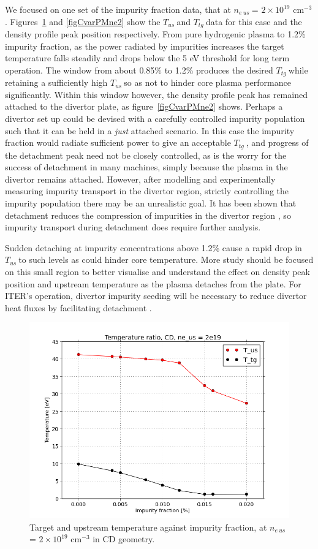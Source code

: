 \documentclass[12pt]{article}  %
\providecommand{\noNe}[1]{{${#1}\times 10^{19}$ cm$^{-3}$}} %
\providecommand{\neus}{$n_{e~us}~$} %
\providecommand{\Tus}{$T_{us}~$} %
\providecommand{\Ttg}{$T_{tg}~$} %
\begin{document}
We focused on one set of the impurity fraction data, that at \neus = \noNe{2}.  Figures~\ref{figCvarTRne2} and \ref{figCvarPMne2} show the \Tus and \Ttg data for this case and the density profile peak position respectively. From pure hydrogenic plasma to 1.2\% impurity fraction, as the power radiated by impurities increases the target temperature falls steadily and drops below the 5 eV threshold for long term operation. The window from about 0.85\% to 1.2\% produces the desired \Ttg while retaining a sufficiently high \Tus so as not to hinder core plasma performance significantly. Within this window however, the density profile peak has remained attached to the divertor plate, as figure~\ref{figCvarPMne2} shows. Perhaps a divertor set up could be devised with a carefully controlled impurity population such that it can be held in a \textit{just} attached scenario. In this case the impurity fraction would radiate sufficient power to give an acceptable \Ttg, and progress of the detachment peak need not be closely controlled, as is the worry for the success of detachment in many machines, simply because the plasma in the divertor remains attached. However, after modelling and experimentally measuring impurity transport in the divertor region, strictly controlling the impurity population there may be an unrealistic goal. It has been shown that detachment reduces the compression of impurities in the divertor region \cite{Bosch2001}, so impurity transport during detachment does require further analysis.

Sudden detaching at impurity concentrations above 1.2\% cause a rapid drop in \Tus to such levels as could hinder core temperature. More study should be focused on this small region to better visualise and understand the effect on density peak position and upstream temperature as the plasma detaches from the plate. For ITER's operation, divertor impurity seeding will be necessary to reduce divertor heat fluxes by facilitating detachment \cite{Kallenbach2013}.

\begin{figure}
	\includegraphics[scale=0.5]{Figures/sol1d/CvarTRne2.png}
	\centering
	\caption{Target and upstream temperature against impurity fraction, at \neus = \noNe{2} in CD geometry.}\label{figCvarTRne2}
\end{figure}
\end{document}
